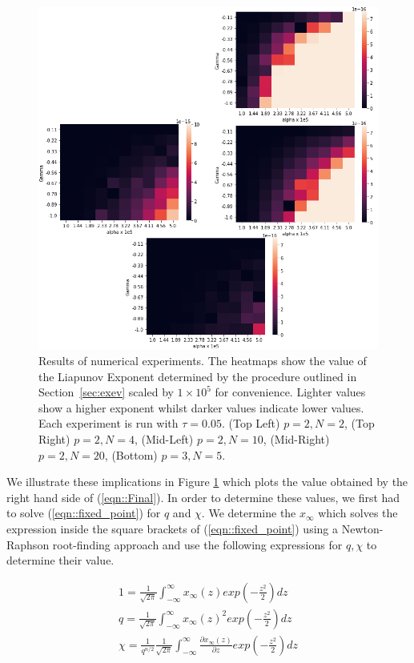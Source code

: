 \documentclass[sigconf,anonymous]{aamas}
\newcommand{\xfixed}{x_\infty}
\newcommand\fb[1]{\textcolor{blue}{FB: #1}}
\begin{document}
\begin{figure}
    \centering
    \includegraphics[width = 1.1 \linewidth]{Figures/Theory.png}
    \caption{Results of numerical experiments. The heatmaps show the value of the Liapunov Exponent determined by the procedure outlined in Section~\ref{sec:exev} scaled by $1 \times 10^5$ for convenience. Lighter values show a higher exponent whilst darker values indicate lower values. Each experiment is run with $\tau = 0.05$. (Top Left) $p = 2, N = 2$, (Top Right) $p = 2, N = 4$, (Mid-Left) $p = 2, N = 10$, (Mid-Right) $p = 2, N = 20$, (Bottom) $p = 3, N = 5$.}
    \label{fig:theory}
\end{figure}

We illustrate these implications in Figure \ref{fig:theory} which plots the value obtained by the right hand side of (\ref{eqn::Final}). In order to determine these values, we first had to solve (\ref{eqn::fixed_point}) for $q$ and $\chi$. We determine the $\xfixed$ which solves the expression inside the square brackets of (\ref{eqn::fixed_point}) using a Newton-Raphson root-finding approach and use the following expressions for $q, \chi$ to determine their value. 

\begin{equation*}
    \begin{split}
        1 = \frac{1}{\sqrt{2 \pi}} \int_{-\infty}^{\infty} \xfixed(z) exp(-\frac{z^2}{2}) dz \\ 
        q = \frac{1}{\sqrt{2 \pi}} \int_{-\infty}^{\infty} \xfixed(z)^2 exp(-\frac{z^2}{2}) dz \\ 
        \chi = \frac{1}{q^{n/2}}\frac{1}{\sqrt{2 \pi}} \int_{-\infty}^{\infty} \frac{\partial \xfixed (z)}{\partial z} exp(-\frac{z^2}{2}) dz
    \end{split}
\end{equation*}
\end{document}
